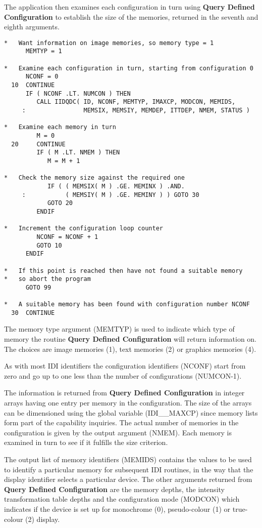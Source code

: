 The application then examines each configuration in turn using
{\bf Query Defined Configuration} to establish the size of the memories,
returned in the seventh and eighth arguments.
\begin{small}
\begin{verbatim}
*   Want information on image memories, so memory type = 1
      MEMTYP = 1

*   Examine each configuration in turn, starting from configuration 0
      NCONF = 0
  10  CONTINUE
      IF ( NCONF .LT. NUMCON ) THEN
         CALL IIDQDC( ID, NCONF, MEMTYP, IMAXCP, MODCON, MEMIDS,
     :                MEMSIX, MEMSIY, MEMDEP, ITTDEP, NMEM, STATUS )

*   Examine each memory in turn
         M = 0
  20     CONTINUE
         IF ( M .LT. NMEM ) THEN
            M = M + 1

*   Check the memory size against the required one
            IF ( ( MEMSIX( M ) .GE. MEMINX ) .AND.
     :           ( MEMSIY( M ) .GE. MEMINY ) ) GOTO 30
            GOTO 20
         ENDIF

*   Increment the configuration loop counter
         NCONF = NCONF + 1
         GOTO 10
      ENDIF

*   If this point is reached then have not found a suitable memory
*   so abort the program
      GOTO 99

*   A suitable memory has been found with configuration number NCONF
  30  CONTINUE
\end{verbatim}
\end{small}

The memory type argument (MEMTYP) is used to indicate which type of memory
the routine {\bf Query Defined Configuration} will return information on.
The choices are image memories (1), text memories (2) or graphics
memories (4).

As with most IDI identifiers the configuration identifiers (NCONF)
start from zero and go up to one less than the number of configurations
(NUMCON-1).

The information is returned from {\bf Query Defined Configuration} in
integer arrays having one entry per memory in the configuration. The
size of the arrays can be dimensioned using the global variable
(IDI\_\_MAXCP) since memory lists form part of the capability inquiries.
The actual number of memories in the configuration is given by the output
argument (NMEM). Each memory is examined in turn to see if it fulfills
the size criterion.

The output list of memory identifiers (MEMIDS) contains the values to
be used to identify a particular memory for subsequent IDI routines,
in the way that the display identifier selects a particular device.
The other arguments returned from {\bf Query Defined Configuration}
are the memory depths, the intensity transformation table depths and
the configuration mode (MODCON) which indicates if the device is set
up for monochrome (0), pseudo-colour (1) or true-colour (2) display.

